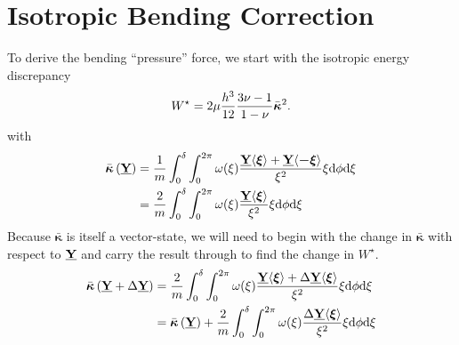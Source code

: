 \section{Isotropic Bending Correction}
To derive the bending ``pressure'' force, we start with the isotropic energy discrepancy
%
\begin{equation}
    W^\star=2\mu\frac{h^3}{12}\frac{3\nu-1}{1-\nu}\bar{\boldsymbol{\kappa}}^2. \notag
\end{equation}
%
with
%
\begin{align}
    \bar{\boldsymbol{\kappa}}\left(\vstate{Y}{}{}\right) &= \frac{1}{m} \int_0^\delta \int_0^{2\pi}\omega(\xi)\frac{\vstate{Y}{}{\boldsymbol{\xi}}+\vstate{Y}{}{\boldsymbol{-\xi}}}{\xi^2} \xi {\rm d}\phi {\rm d}\xi \notag \\
    &= \frac{2}{m} \int_0^\delta \int_0^{2\pi}\omega(\xi)\frac{\vstate{Y}{}{\boldsymbol{\xi}}}{\xi^2} \xi {\rm d}\phi {\rm d}\xi \notag
\end{align}
Because $\bar{\boldsymbol{\kappa}}$ is itself a vector-state, we will need to begin with the change in $\bar{\boldsymbol{\kappa}}$ with respect to $\vstate{Y}{}{}$ and carry the result through to find the change in $W^\star$.
\begin{align}
    \bar{\boldsymbol{\kappa}}\left(\vstate{Y}{}{}+\Delta\vstate{Y}{}{}\right) &= \frac{2}{m} \int_0^\delta \int_0^{2\pi}\omega(\xi)\frac{\vstate{Y}{}{\boldsymbol{\xi}}+\Delta\vstate{Y}{}{\boldsymbol{\xi}}}{\xi^2} \xi {\rm d}\phi {\rm d}\xi \notag \\
    &= \bar{\boldsymbol{\kappa}}\left(\vstate{Y}{}{}\right) + \frac{2}{m} \int_0^\delta \int_0^{2\pi}\omega(\xi)\frac{\Delta\vstate{Y}{}{\boldsymbol{\xi}}}{\xi^2} \xi {\rm d}\phi {\rm d}\xi \notag 
\end{align}
%
%
